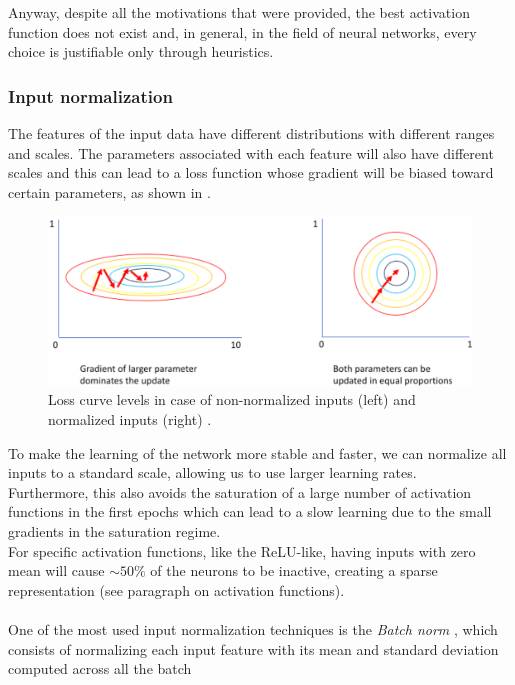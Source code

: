Anyway, despite all the motivations that were provided, the best activation function does not exist and, in general, in the field of neural networks, every choice is justifiable only through heuristics.


\subsubsection*{Input normalization}
The features of the input data have different distributions with different ranges and scales. The parameters associated with each feature will also have different scales and this can lead to a loss function whose gradient will be biased toward certain parameters, as shown in .\\
\vspace{-0.5cm}
\begin{figure}[H]
    \hspace{-0.5cm}
    \centering
    \includegraphics[width=0.85\linewidth]{fig/chap05-stats/loss_norm.png}
    \vspace{0.5cm}
    \caption{Loss curve levels in case of non-normalized inputs (left) and normalized inputs (right) \cite{NormalizingNormalization.}.}
    \label{fig:loss_normalization}
    \vspace{-0.5cm}
\end{figure}
To make the learning of the network more stable and faster, we can normalize all inputs to a standard scale, allowing us to use larger learning rates.\\
Furthermore, this also avoids the saturation of a large number of activation functions in the first epochs which can lead to a slow learning due to the small gradients in the saturation regime.\\
For specific activation functions, like the ReLU-like, having inputs with zero mean will cause $\sim 50\%$ of the neurons to be inactive, creating a sparse representation (see paragraph on activation functions).\\
\\
One of the most used input normalization techniques is the \textit{Batch norm} \cite{Ioffe2015BatchShift}, which consists of normalizing each input feature with its mean and standard deviation computed across all the batch
